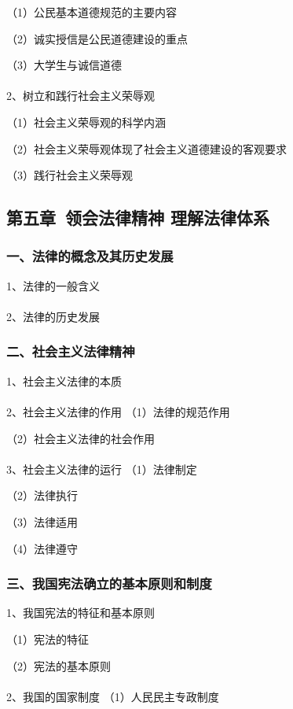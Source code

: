 \documentclass{ctexart}
\begin{document}
（1）公民基本道德规范的主要内容

（2）诚实授信是公民道德建设的重点

（3）大学生与诚信道德
\\\\

2、树立和践行社会主义荣辱观

（1）社会主义荣辱观的科学内涵

（2）社会主义荣辱观体现了社会主义道德建设的客观要求

（3）践行社会主义荣辱观



\subsection{第五章\ 领会法律精神 理解法律体系}
\subsubsection{一、法律的概念及其历史发展}

1、法律的一般含义
\\\\

2、法律的历史发展

\subsubsection{二、社会主义法律精神}
1、社会主义法律的本质
\\\\

2、社会主义法律的作用
（1）法律的规范作用

（2）社会主义法律的社会作用
\\\\

3、社会主义法律的运行
（1）法律制定

（2）法律执行

（3）法律适用

（4）法律遵守

\subsubsection{三、我国宪法确立的基本原则和制度}
1、我国宪法的特征和基本原则

（1）宪法的特征

（2）宪法的基本原则
\\\\

2、我国的国家制度
（1）人民民主专政制度
\end{document}
